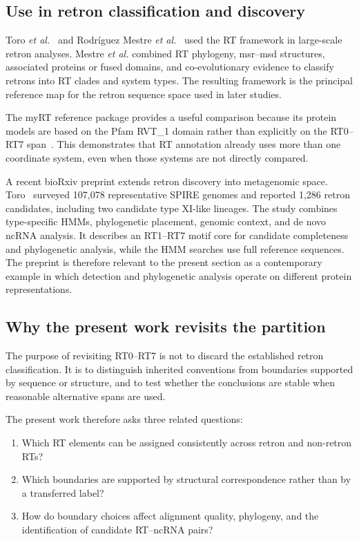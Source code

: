 \subsection{Use in retron classification and discovery}

Toro \textit{et al.}~\cite{toro2019} and Rodríguez Mestre \textit{et al.}~\cite{mestre2020}
used the RT framework in large-scale retron analyses. Mestre \textit{et al.}
combined RT phylogeny, msr--msd structures, associated proteins or fused
domains, and co-evolutionary evidence to classify retrons into RT clades and
system types. The resulting framework is the principal reference map for the
retron sequence space used in later studies.

The myRT reference package provides a useful comparison because its protein
models are based on the Pfam RVT\_1 domain rather than explicitly on the
RT0--RT7 span~\cite{sharifi2022}. This demonstrates that RT annotation already
uses more than one coordinate system, even when those systems are not directly
compared.

A recent bioRxiv preprint extends retron discovery into metagenomic space.
Toro~\cite{toro2026} surveyed 107{,}078 representative SPIRE genomes and
reported 1{,}286 retron candidates, including two candidate type XI-like
lineages. The study combines type-specific HMMs, phylogenetic placement,
genomic context, and de novo ncRNA analysis. It describes an RT1--RT7 motif
core for candidate completeness and phylogenetic analysis, while the HMM
searches use full reference sequences. The preprint is therefore relevant to
the present section as a contemporary example in which detection and
phylogenetic analysis operate on different protein representations.

\subsection{Why the present work revisits the partition}

The purpose of revisiting RT0--RT7 is not to discard the established retron
classification. It is to distinguish inherited conventions from boundaries
supported by sequence or structure, and to test whether the conclusions are
stable when reasonable alternative spans are used.

The present work therefore asks three related questions:
\begin{enumerate}
  \item Which RT elements can be assigned consistently across retron and
        non-retron RTs?
  \item Which boundaries are supported by structural correspondence rather
        than by a transferred label?
  \item How do boundary choices affect alignment quality, phylogeny, and the
        identification of candidate RT--ncRNA pairs?
\end{enumerate}

